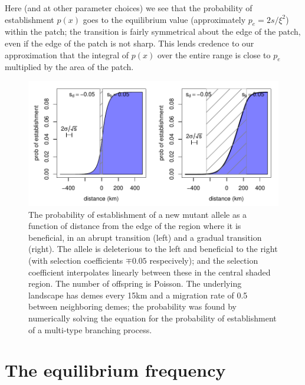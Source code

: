 \documentclass{article}
\begin{document}
Here (and at other parameter choices) we see that the probability of establishment $p(x)$ goes to the equilibrium value
(approximately $p_e = 2s/\xi^2$) within the patch;
the transition is fairly symmetrical about the edge of the patch, even if the edge of the patch is not sharp.
This lends credence to our approximation that the integral of $p(x)$ over the entire range
is close to $p_e$ multiplied by the area of the patch.

\begin{figure}[ht!]
    \begin{center}
        \includegraphics{prob-establishment}
    \end{center}
    \caption{The probability of establishment of a new mutant allele as a function of distance from the edge of the region where it is beneficial,
    in an abrupt transition (left) and a gradual transition (right).
    The allele is deleterious to the left and beneficial to the right (with selection coefficients $\mp 0.05$ respecively);
    and the selection coefficient interpolates linearly between these in the central shaded region.
    The number of offspring is Poisson.
    The underlying landscape has demes every 15km and a migration rate of 0.5 between neighboring demes;
    the probability was found by numerically solving the equation for the probability of establishment of a multi-type branching process.
    \label{fig:prob_estab_calcs}
    }
\end{figure}


\section{The equilibrium frequency}
\label{apx:eqfreq}
\end{document}
